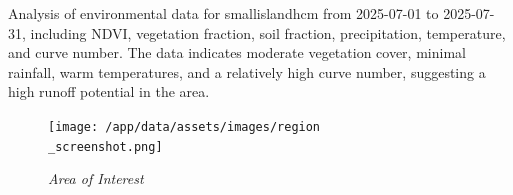 \documentclass[12pt,a4paper]{article}
\begin{document}
\noindent   
\begingroup
  \contentfont
  \color{black}%
  \normalfont
  \fontsize{16pt}{20pt}\selectfont
Analysis of environmental data for smallislandhcm from 2025-07-01 to 2025-07-31, including NDVI, vegetation fraction, soil fraction, precipitation, temperature, and curve number. The data indicates moderate vegetation cover, minimal rainfall, warm temperatures, and a relatively high curve number, suggesting a high runoff potential in the area.
\par
\endgroup

\begin{figure}[h!]
    \centering
    \texttt{[image: /app/data/assets/images/region\\\_screenshot.png]}
    \caption{\textit{Area of Interest}}
\end{figure}
\end{document}
